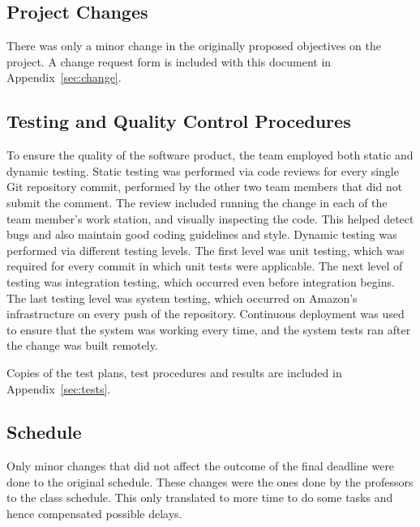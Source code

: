 \subsection{Project Changes}
There was only a minor change in the originally proposed objectives on the project. A change request form is included with this document in Appendix~\ref{sec:change}.
   
\subsection{Testing and Quality Control Procedures}

To ensure the quality of the software product, the team employed both static
and dynamic testing. Static testing was performed via code reviews for every
single Git repository commit, performed by the other two team members
that did not submit the comment. The review included running the change in each of the team
member's work station, and visually inspecting the code. This helped detect
bugs and also maintain good coding guidelines and style. Dynamic testing was
performed via different testing levels. The first level was unit testing,
which was required for every commit in which unit tests were applicable. The next level of testing was integration testing, which occurred even before integration begins. The last testing level was system
testing, which occurred on Amazon's infrastructure on every push of the
repository. Continuous deployment was used to ensure
that the system was working every time, and the system tests ran after the
change was built remotely.

Copies of the test plans, test procedures and results are included in Appendix~\ref{sec:tests}.

\subsection{Schedule}

Only minor changes that did not affect the outcome of the final deadline were done to the original schedule. These changes were the ones done by the professors to the class schedule. This only translated to more time to do some tasks and hence compensated possible delays.
